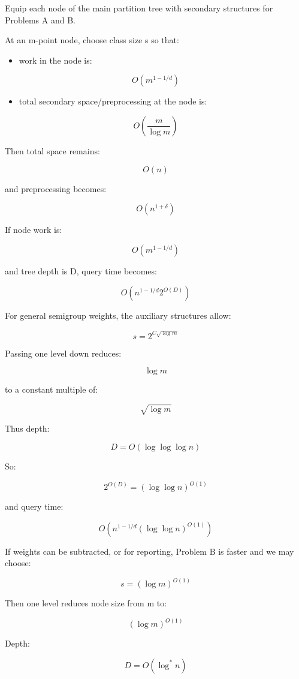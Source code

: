 \documentclass[
  11pt,
]{article}
\providecommand{\tightlist}{%
  \setlength{\itemsep}{0pt}\setlength{\parskip}{0pt}}
\begin{document}
Equip each node of the main partition tree with secondary structures for
Problems A and B.

At an m-point node, choose class size s so that:

\begin{itemize}
\tightlist
\item
  work in the node is:
\end{itemize}

\[
O(m^{1-1/d})
\]

\begin{itemize}
\tightlist
\item
  total secondary space/preprocessing at the node is:
\end{itemize}

\[
O\left(\frac{m}{\log m}\right)
\]

Then total space remains:

\[
O(n)
\]

and preprocessing becomes:

\[
O(n^{1+\delta})
\]

If node work is:

\[
O(m^{1-1/d})
\]

and tree depth is D, query time becomes:

\[
O(n^{1-1/d}2^{O(D)})
\]

For general semigroup weights, the auxiliary structures allow:

\[
s=2^{C\sqrt{\log m}}
\]

Passing one level down reduces:

\[
\log m
\]

to a constant multiple of:

\[
\sqrt{\log m}
\]

Thus depth:

\[
D=O(\log\log\log n)
\]

So:

\[
2^{O(D)}=(\log\log n)^{O(1)}
\]

and query time:

\[
O(n^{1-1/d}(\log\log n)^{O(1)})
\]

If weights can be subtracted, or for reporting, Problem B is faster and
we may choose:

\[
s=(\log m)^{O(1)}
\]

Then one level reduces node size from m to:

\[
(\log m)^{O(1)}
\]

Depth:

\[
D=O(\log^\ast  n)
\]
\end{document}
